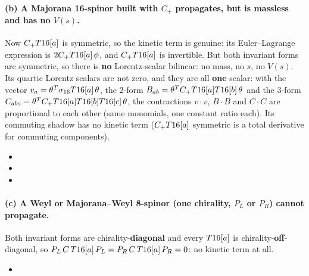 \paragraph{(b) A Majorana 16-spinor built with $C_+$ propagates, but is massless and has no $V(s)$.}
Now $C_+T16[a]$ is symmetric, so the kinetic term is genuine: its Euler--Lagrange expression is
$2C_+T16[a]\,\phi$, and $C_+T16[a]$ is invertible. But both invariant forms are symmetric, so
there is \textbf{no} Lorentz-scalar bilinear: no mass, no $s$, no $V(s)$. Its quartic Lorentz
scalars are not zero, and they are all \textbf{one} scalar: with the vector
$v_a=\theta^{T}\sigma_{16}T16[a]\,\theta$, the 2-form $B_{ab}=\theta^{T}C_+T16[a]T16[b]\,\theta$
and the 3-form $C_{abc}=\theta^{T}C_+T16[a]T16[b]T16[c]\,\theta$, the contractions $v\cdot v$,
$B\cdot B$ and $C\cdot C$ are proportional to each other (same monomials, one constant ratio each).
Its commuting shadow has no kinetic term ($C_+T16[a]$ symmetric is a total derivative for
commuting components). 
\begin{itemize}
  \item {}
  \item {}
  \item {}
\end{itemize}

\paragraph{(c) A Weyl or Majorana--Weyl 8-spinor (one chirality, $P_L$ or $P_R$) cannot propagate.}
Both invariant forms are chirality-\textbf{diagonal} and every $T16[a]$ is
chirality-\textbf{off}-diagonal, so $P_L\,C\,T16[a]\,P_L=P_R\,C\,T16[a]\,P_R=0$: no kinetic term
at all. 
\begin{itemize}
  \item {}
\end{itemize}

